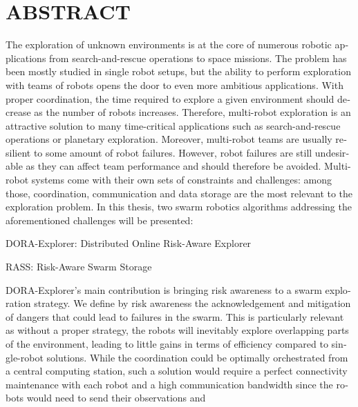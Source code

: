 %

\chapter*{ABSTRACT}\thispagestyle{headings}

\begin{otherlanguage}{english}
The exploration of unknown environments is at the core of numerous
robotic applications from search-and-rescue operations to space
missions. The problem has been mostly 
studied in single robot setups, but the ability to perform exploration 
with teams of robots opens the door to even more ambitious
applications. With proper coordination, the time required to
explore a given environment should decrease as the number of robots increases. Therefore, multi-robot
exploration is an attractive solution to many time-critical
applications such as search-and-rescue operations or planetary
exploration. Moreover, multi-robot teams are usually resilient to some
amount of robot
failures. However,
robot failures are still undesirable as they can affect team
performance and should therefore be avoided. Multi-robot systems come with their own sets of constraints and
challenges: among those, coordination, communication and data storage are the most
relevant to the exploration problem. In this thesis, two swarm robotics algorithms addressing the aforementioned challenges will be presented:
\begin{compactitem}
    \item DORA-Explorer: Distributed Online Risk-Aware Explorer
    \item RASS: Risk-Aware Swarm Storage
\end{compactitem}
DORA-Explorer's main contribution is bringing risk awareness to a swarm exploration strategy. We define by risk awareness the acknowledgement and mitigation of dangers that could lead to failures in the swarm. This is particularly relevant as without a proper strategy, the robots
will inevitably explore overlapping parts of the environment, leading
to little gains in terms of efficiency compared to single-robot
solutions. While the coordination could be optimally orchestrated from
a central computing station, such a solution would require a perfect
connectivity maintenance with each robot and a high communication
bandwidth since the robots would need to send their observations and

\end{otherlanguage}
